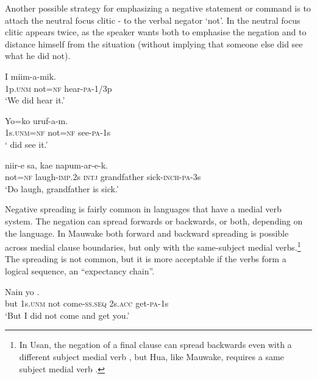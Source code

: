 Another possible strategy for emphasizing a negative statement or command is to attach the neutral focus clitic - to the verbal negator  `not'. In  the neutral focus clitic appears twice, as the speaker wants both to emphasise the negation and to distance himself from the situation (without implying that someone else did see what he did not). 

\ea%
\label{ex:x1152}
\gll I    miim-a-mik. \\
1p.\textsc{unm}  not=\textsc{nf}  hear-\textsc{pa}-1/3p\\
\glt `We did  hear it.'
\z

\ea%
\label{ex:x1136}
\gll Yo=ko    uruf-a-m. \\
1s.\textsc{unm}=\textsc{nf}  not=\textsc{nf}  see-\textsc{pa}-1s\\
\glt ` did  see it.'
\z

\ea%
\label{ex:x1137}
\gll {}  niir-e  sa,  kae  napum-ar-e-k. \\
not=\textsc{nf}  laugh-\textsc{imp}.2s  \textsc{intj}  grandfather  sick-\textsc{inch}-\textsc{pa}-3s\\
\glt `Do  laugh, grandfather is sick.'
\z

Negative spreading is fairly common in languages that have a medial verb system. The negation can spread forwards or backwards, or both, depending on the language. In Mauwake both forward  and backward  spreading is possible across medial clause boundaries, but only with the same-subject medial verbs.\footnote{In Usan, the negation of a final clause can spread backwards even with a different subject medial verb  \citep[282]{Reesink1987}, but Hua, like Mauwake, requires a same subject medial verb \citep[408]{Haiman1980}.} The spreading is not common, but it is more acceptable if the verbs form a logical sequence, an ``expectancy chain''.

\ea%
\label{ex:x1138}
\gll Nain  yo        . \\
but  1s.\textsc{unm}  not  come-\textsc{ss}.\textsc{seq}  2s.\textsc{acc}  get-\textsc{pa}-1s\\
\glt `But I did not come and get you.'
\z

